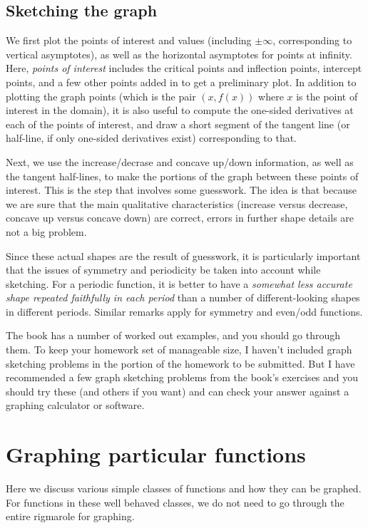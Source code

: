 \documentclass[10pt]{amsart}
\begin{document}
\subsection{Sketching the graph}

We first plot the points of interest and values (including $\pm
\infty$, corresponding to vertical asymptotes), as well as the
horizontal asymptotes for points at infinity. Here, {\em points of
interest} includes the critical points and inflection points,
intercept points, and a few other points added in to get a preliminary
plot. In addition to plotting the graph points (which is the pair
$(x,f(x))$ where $x$ is the point of interest in the domain), it is
also useful to compute the one-sided derivatives at each of the points
of interest, and draw a short segment of the tangent line (or
half-line, if only one-sided derivatives exist) corresponding to that.

Next, we use the increase/decrase and concave up/down information, as
well as the tangent half-lines, to make the portions of the graph
between these points of interest. This is the step that involves some
guesswork. The idea is that because we are sure that the main
qualitative characteristics (increase versus decrease, concave up
versus concave down) are correct, errors in further shape details are
not a big problem.

Since these actual shapes are the result of guesswork, it is
particularly important that the issues of symmetry and periodicity be
taken into account while sketching. For a periodic function, it is
better to have a {\em somewhat less accurate shape repeated faithfully
in each period} than a number of different-looking shapes in different
periods. Similar remarks apply for symmetry and even/odd functions.

The book has a number of worked out examples, and you should go
through them. To keep your homework set of manageable size, I haven't
included graph sketching problems in the portion of the homework to be
submitted. But I have recommended a few graph sketching problems from
the book's exercises and you should try these (and others if you want)
and can check your answer against a graphing calculator or software.

\section{Graphing particular functions}

Here we discuss various simple classes of functions and how they can
be graphed. For functions in these well behaved classes, we do not
need to go through the entire rigmarole for graphing.
\end{document}
